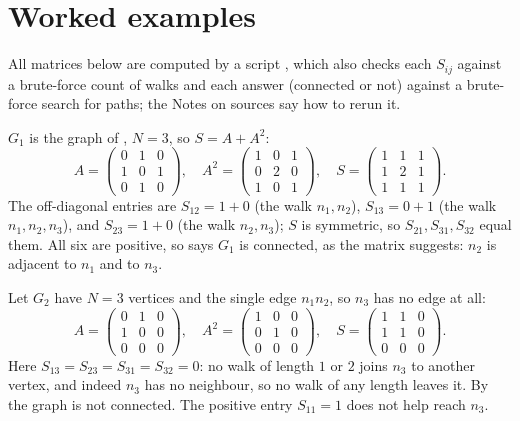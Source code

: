 \section{Worked examples}\label{sec:examples}

All matrices below are computed by a script \cite{m2_connectivity_script}, which also checks each $S_{ij}$ against a brute-force count of walks and each answer (connected or not) against a brute-force search for paths; the Notes on sources say how to rerun it.

\begin{example}\label{ex:test1}
$G_1$ is the graph of , $N = 3$, so $S = A + A^2$:
\[
A = \begin{pmatrix} 0&1&0\\ 1&0&1\\ 0&1&0 \end{pmatrix},\quad
A^2 = \begin{pmatrix} 1&0&1\\ 0&2&0\\ 1&0&1 \end{pmatrix},\quad
S = \begin{pmatrix} 1&1&1\\ 1&2&1\\ 1&1&1 \end{pmatrix}.
\]
The off-diagonal entries are $S_{12} = 1 + 0$ (the walk $n_1, n_2$), $S_{13} = 0 + 1$ (the walk $n_1, n_2, n_3$), and $S_{23} = 1 + 0$ (the walk $n_2, n_3$); $S$ is symmetric, so $S_{21}, S_{31}, S_{32}$ equal them. All six are positive, so  says $G_1$ is connected, as the matrix suggests: $n_2$ is adjacent to $n_1$ and to $n_3$.
\end{example}

\begin{example}\label{ex:test2}
Let $G_2$ have $N = 3$ vertices and the single edge $n_1n_2$, so $n_3$ has no edge at all:
\[
A = \begin{pmatrix} 0&1&0\\ 1&0&0\\ 0&0&0 \end{pmatrix},\quad
A^2 = \begin{pmatrix} 1&0&0\\ 0&1&0\\ 0&0&0 \end{pmatrix},\quad
S = \begin{pmatrix} 1&1&0\\ 1&1&0\\ 0&0&0 \end{pmatrix}.
\]
Here $S_{13} = S_{23} = S_{31} = S_{32} = 0$: no walk of length $1$ or $2$ joins $n_3$ to another vertex, and indeed $n_3$ has no neighbour, so no walk of any length leaves it. By  the graph is not connected. The positive entry $S_{11} = 1$ does not help reach $n_3$.
\end{example}
